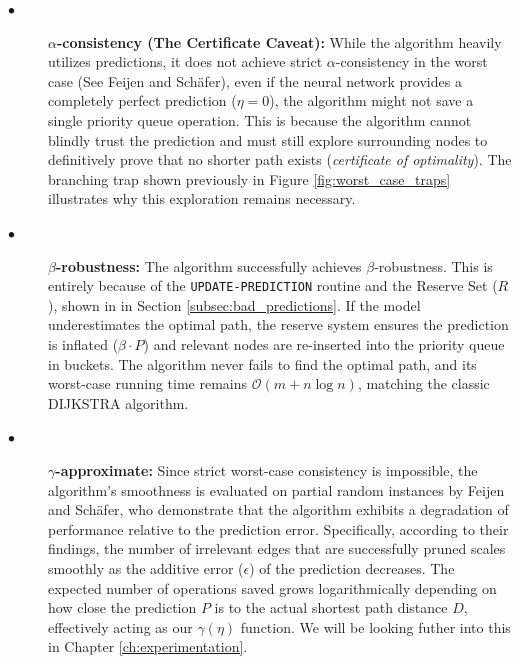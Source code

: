 \begin{description}
    \item[$\bullet$] \textbf{$\alpha$-consistency (The Certificate Caveat):} While the algorithm heavily utilizes predictions, it does not achieve strict $\alpha$-consistency in the worst case (See Feijen and Schäfer\cite[Sec.~4.1]{feijenDijkstrasAlgorithmPredictions2023}), even if the neural network provides a completely perfect prediction ($\eta = 0$), the algorithm might not save a single priority queue operation. This is because the algorithm cannot blindly trust the prediction and must still explore surrounding nodes to definitively prove that no shorter path exists (\textit{certificate of optimality}). The branching trap shown previously in Figure \ref{fig:worst_case_traps} illustrates why this exploration remains necessary.
    
    \item[$\bullet$] \textbf{$\beta$-robustness:} The algorithm successfully achieves $\beta$-robustness. This is entirely because of the \texttt{UPDATE-PREDICTION} routine and the Reserve Set ($R$), shown in in Section \ref{subsec:bad_predictions}. If the model underestimates the optimal path, the reserve system ensures the prediction is inflated ($\beta \cdot P$) and relevant nodes are re-inserted into the priority queue in buckets. The algorithm never fails to find the optimal path, and its worst-case running time remains $\mathcal{O}(m + n \log n)$, matching the classic \textsc{DIJKSTRA} algorithm.

    \item[$\bullet$] \textbf{$\gamma$-approximate:} Since strict worst-case consistency is impossible, the algorithm's smoothness is evaluated on partial random instances by Feijen and Schäfer, who demonstrate that the algorithm exhibits a degradation of performance relative to the prediction error. Specifically, according to their findings, the number of irrelevant edges that are successfully pruned scales smoothly as the additive error ($\epsilon$) of the prediction decreases. The expected number of operations saved grows logarithmically depending on how close the prediction $P$ is to the actual shortest path distance $D$, effectively acting as our $\gamma(\eta)$ function. We will be looking futher into this in Chapter \ref{ch:experimentation}.
\end{description}